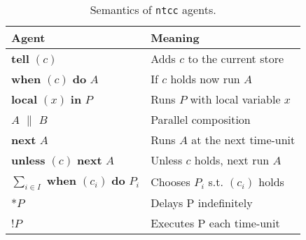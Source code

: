 \documentclass[english]{llncs}
\begin{document}
\begin{table}[!h]
  \begin{center}   
     \begin{tabular}{|ll|}
\hline
Agent & Meaning\\
\hline
\textbf{tell} $(c)$ & Adds $c$ to the current store\\
\textbf{when} $(c)$ \textbf{do} $A$  & If $c$ holds now run $A$\\
\textbf{local} $(x)$ \textbf{in} $P$  & Runs $P$ with local variable $x$\\
$A$ $\|$ $B$ & Parallel composition \\
\textbf{next} $A$ & Runs  $A$ at the next time-unit \\
\textbf{unless} $(c)$ \textbf{next} $A$  & Unless $c$ holds, next run $A$ \\
$\sum _{i \in I}$ \textbf{when} $(c_{i})$ \textbf{do} $P_{i}$  & Chooses  $P_{i}$ s.t. $(c_{i})$ holds \\ *$P$ & Delays P indefinitely \\ !$P$ & Executes P each time-unit\\
\hline
\end{tabular}    
    \caption{Semantics of \texttt{ntcc} agents.}
    \label{tab:ntccagents}
  \end{center}
\end{table}
\end{document}
